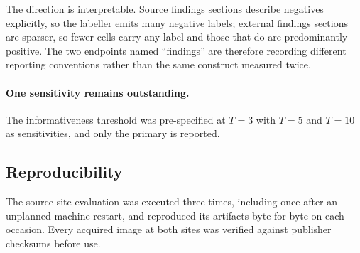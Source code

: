 The direction is interpretable. Source findings sections describe negatives
explicitly, so the labeller emits many negative labels; external findings
sections are sparser, so fewer cells carry any label and those that do are
predominantly positive. The two endpoints named ``findings'' are therefore
recording different reporting conventions rather than the same construct
measured twice.

\paragraph{One sensitivity remains outstanding.} The informativeness threshold
was pre-specified at $T=3$ with $T=5$ and $T=10$ as sensitivities, and only the
primary is reported.

\subsection{Reproducibility}

The source-site evaluation was executed three times, including once after an
unplanned machine restart, and reproduced its artifacts byte for byte on each
occasion. Every acquired image at both sites was verified against publisher
checksums before use.
